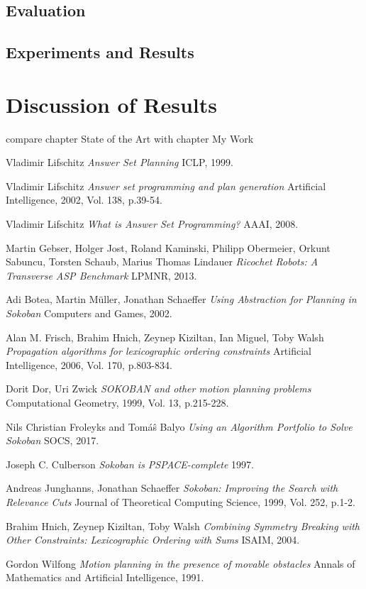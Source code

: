 \documentclass{article}
\begin{document}
\subsection{Evaluation}
\subsection{Experiments and Results}
\section{Discussion of Results}
compare chapter State of the Art with chapter My Work \cite{LifschitzASP}

\begin{thebibliography}{}
Vladimir Lifschitz
\textit{Answer Set Planning}
ICLP, 1999.

Vladimir Lifschitz
\textit{Answer set programming and plan generation}
Artificial Intelligence, 2002, Vol. 138, p.39-54.

Vladimir Lifschitz
\textit{What is Answer Set Programming?}
AAAI, 2008.

Martin Gebser, Holger Jost, Roland Kaminski, Philipp Obermeier, Orkunt Sabuncu, Torsten Schaub, Marius Thomas Lindauer
\textit{Ricochet Robots: A Transverse ASP Benchmark}
LPMNR, 2013.

Adi Botea, Martin Müller, Jonathan Schaeffer
\textit{Using Abstraction for Planning in Sokoban}
Computers and Games, 2002.

Alan M. Frisch, Brahim Hnich, Zeynep Kiziltan, Ian Miguel, Toby Walsh
\textit{Propagation algorithms for lexicographic ordering constraints}
Artificial Intelligence, 2006, Vol. 170, p.803-834.

Dorit Dor, Uri Zwick
\textit{SOKOBAN and other motion planning problems}
Computational Geometry, 1999, Vol. 13, p.215-228.

Nils Christian Froleyks and Tom{\'a}{\^s} Balyo
\textit{Using an Algorithm Portfolio to Solve Sokoban}
SOCS, 2017.

Joseph C. Culberson
\textit{Sokoban is PSPACE-complete}
1997.

Andreas Junghanns, Jonathan Schaeffer
\textit{Sokoban: Improving the Search with Relevance Cuts}
Journal of Theoretical Computing Science, 1999, Vol. 252, p.1-2.

Brahim Hnich, Zeynep Kiziltan, Toby Walsh
\textit{Combining Symmetry Breaking with Other Constraints: Lexicographic Ordering with Sums}
ISAIM, 2004.

Gordon Wilfong
\textit{Motion planning in the presence of movable obstacles}
Annals of Mathematics and Artificial Intelligence, 1991.
\end{thebibliography}
\end{document}
